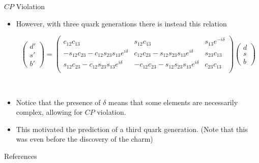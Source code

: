 \documentclass{beamer}
\begin{document}
\begin{frame}{$CP$ Violation}
  \begin{itemize}
    \item However, with three quark generations there is instead this relation
      \begin{center}
      {\tiny
      \begin{equation*}
        \begin{pmatrix} d' \\ s' \\ b' \end{pmatrix} =
        \begin{pmatrix}
          c_{12}c_{13}                                  & s_{12}c_{13}                               & s_{13}e^{-i\delta} \\
          -s_{12}c_{23}-c_{12}s_{23}s_{13}e^{i\delta}   & c_{12}c_{23} - s_{12}s_{23}s_{13}e^{i\delta} & s_{23}c_{13} \\
          s_{12}c_{23}-c_{12}s_{23}s_{13}e^{i\delta}    & -c_{12}c_{23} - s_{12}s_{23}s_{13}e^{i\delta} & c_{23}c_{13} \\
        \end{pmatrix}
        \begin{pmatrix} d \\ s \\ b \end{pmatrix}
      \end{equation*}
      }
      \end{center}
      \pause\
    \item Notice that the presence of $\delta$ means that some elements are necessarily complex, allowing for $CP$ violation.
    \pause\
    \item This motivated the prediction of a third quark generation. (Note that this was even before the discovery of the charm)
  \end{itemize}
\end{frame}
\begin{frame}{References}
    
    {\tiny
    
    }
\end{frame}
\end{document}
